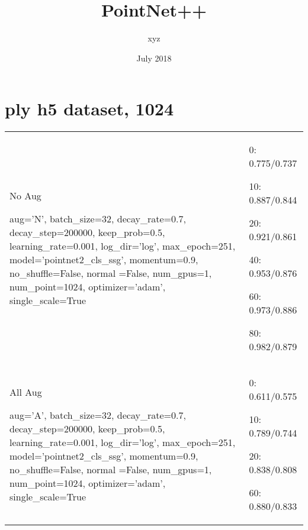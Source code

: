 \documentclass[,table,dvipsnames]{article}
\title{PointNet++}
\author{xyz}
\date{July 2018}
\begin{document}
\noindent
\begin{titlepage}
	\maketitle
\end{titlepage}	

\section{ply h5 dataset, 1024}
\noindent\begin{tabular}{|p{10cm}|p{5.5cm}| }	
\hline
\rowcolor{green!20}
No Aug\par
aug='N', batch\_size=32, decay\_rate=0.7, decay\_step=200000, keep\_prob=0.5, learning\_rate=0.001, log\_dir='log', max\_epoch=251, model='pointnet2\_cls\_ssg', momentum=0.9, no\_shuffle=False, normal    =False, num\_gpus=1, num\_point=1024, optimizer='adam', single\_scale=True& 
0: 0.775/0.737\par 10: 0.887/0.844\par 20: 0.921/0.861\par 40: 0.953/0.876\par  60: 0.973/0.886\par 80: 0.982/0.879\\	

\rowcolor{red!20}
All Aug\par 
aug='A', batch\_size=32, decay\_rate=0.7, decay\_step=200000, keep\_prob=0.5, learning\_rate=0.001, log\_dir='log', max\_epoch=251, model='pointnet2\_cls\_ssg', momentum=0.9, no\_shuffle=False, normal    =False, num\_gpus=1, num\_point=1024, optimizer='adam', single\_scale=True& 
0: 0.611/0.575\par  10: 0.789/0.744\par 20: 0.838/0.808\par 60: 0.880/0.833\\

\hline 	
\end{tabular}
\end{document}

